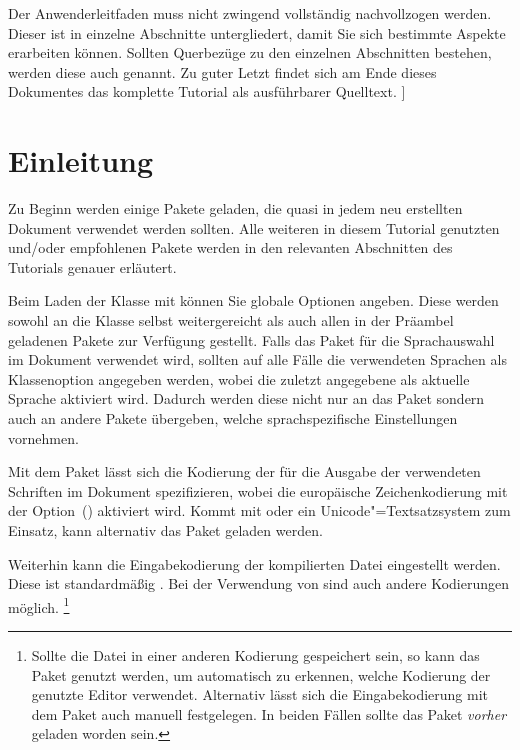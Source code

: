 \documentclass[%
  english,ngerman,%
  cdgeometry=no,DIV=12,automark%
]{tudscrartcl}
\begin{document}
  Der Anwenderleitfaden muss nicht zwingend vollständig nachvollzogen werden. 
  Dieser ist in einzelne Abschnitte untergliedert, damit Sie sich bestimmte 
  Aspekte erarbeiten können. Sollten Querbezüge zu den einzelnen Abschnitten 
  bestehen, werden diese auch genannt. Zu guter Letzt findet sich am Ende 
  dieses Dokumentes das komplette Tutorial als ausführbarer Quelltext. 
]
\tableofcontents
\listoffigures
\listoftables



\section{Einleitung}
\label{sec:introduction}%
%
Zu Beginn werden einige Pakete geladen, die quasi in jedem neu erstellten 
Dokument verwendet werden sollten. Alle weiteren in diesem Tutorial genutzten 
und/oder empfohlenen Pakete werden in den relevanten Abschnitten des Tutorials 
genauer erläutert. 

Beim Laden der Klasse mit  können Sie globale Optionen 
angeben. Diese werden sowohl an die Klasse selbst weitergereicht als auch allen 
in der Präambel geladenen Pakete zur Verfügung gestellt. Falls das Paket 
 für die Sprachauswahl im Dokument verwendet wird, sollten auf 
alle Fälle die verwendeten Sprachen als Klassenoption angegeben werden, wobei 
die zuletzt angegebene als aktuelle Sprache aktiviert wird. Dadurch werden 
diese nicht nur an das Paket  sondern auch an andere Pakete 
übergeben, welche sprachspezifische Einstellungen vornehmen.
%
%
Mit dem Paket  lässt sich die Kodierung der für die Ausgabe 
der verwendeten Schriften im Dokument spezifizieren, wobei die europäische 
Zeichenkodierung mit der Option~() aktiviert wird. 
Kommt mit  oder  ein Unicode"=Textsatzsystem 
zum Einsatz, kann alternativ das Paket  geladen werden.

Weiterhin kann die Eingabekodierung der kompilierten Datei eingestellt werden. 
Diese ist standardmäßig . Bei der Verwendung von  
sind auch andere Kodierungen möglich.%
\footnote{%
  Sollte die Datei in einer anderen Kodierung gespeichert sein, so kann das 
  Paket  genutzt werden, um automatisch zu erkennen, welche 
  Kodierung der genutzte Editor verwendet. Alternativ lässt sich die 
  Eingabekodierung mit dem Paket  auch manuell festgelegen. 
  In beiden Fällen sollte das Paket  \emph{vorher} geladen 
  worden sein.
} 
\end{document}
